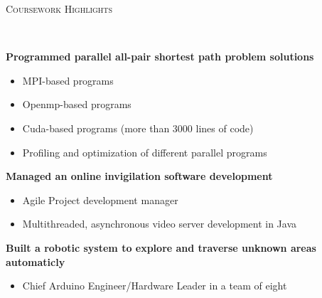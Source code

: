 \documentclass[a4paper, 12pt]{article}
\newenvironment{changemargin}[2]{%
  \begin{list}{}{%
      \setlength{\topsep}{0pt}%
      \setlength{\leftmargin}{#1}%
      \setlength{\rightmargin}{#2}%
      \setlength{\listparindent}{\parindent}%
      \setlength{\itemindent}{\parindent}%
      \setlength{\parsep}{\parskip}%
    }%
  \item[]}{\end{list}
}
\newcommand{\lineover}{
  \begin{changemargin}{-0.05in}{-0.05in}
    \vspace*{-8pt}
    \hrulefill \\
    \vspace*{-2pt}
  \end{changemargin}
}
\newcommand{\header}[1]{
  \begin{changemargin}{-0.6in}{-0.6in}
    \fontsize{15}{15}\scshape{#1}\\
    \lineover
    \vspace*{-4pt}
  \end{changemargin}
}
\newenvironment{body}
{
\vspace*{-16pt}
\begin{changemargin}{-0.25in}{-0.5in}
}
{
\end{changemargin}
}
\begin{document}
%
%
%
%
\header{Coursework Highlights}
\begin{body}
  \vspace{14pt}
  \textbf{Programmed parallel all-pair shortest path problem solutions}\\
  \vspace*{-6pt}
    \begin{itemize} \itemsep -0pt \small
        \item MPI-based programs
        \item Openmp-based programs
        \item Cuda-based programs (more than 3000 lines of code)
        \item Profiling and optimization of different parallel programs
    \end{itemize}
  \vspace*{-6pt}
  \textbf{Managed an online invigilation software development}\\
  \vspace*{-6pt}
    \begin{itemize} \itemsep -0pt \small
        \item Agile Project development manager
        \item Multithreaded, asynchronous video server development in Java
    \end{itemize}
  \vspace*{-6pt}
  \textbf{Built a robotic system to explore and traverse unknown areas automaticly}\\
  \vspace*{-6pt}
    \begin{itemize} \itemsep -0pt \small
        \item Chief Arduino Engineer/Hardware Leader in a team of eight

\end{itemize}
\end{body}
\end{document}
